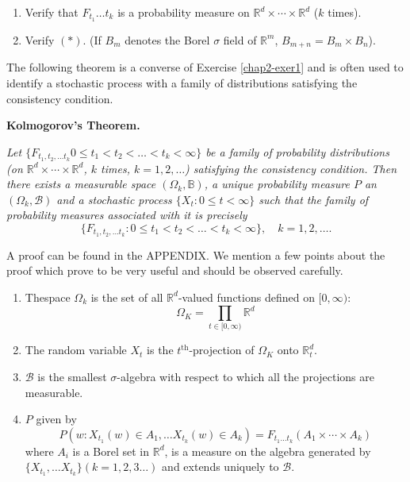 \setcounter{exercise}{0}
\begin{exercise}\label{chap2-exer1}
\begin{enumerate}
\renewcommand{\theenumi}{\alph{enumi}}
\renewcommand{\labelenumi}{(\theenumi)}
\item Verify that $F_{t_{1}}\ldots t_{k}$ is a probability measure on
  $\mathbb{R}^{d}\times\cdots\times \mathbb{R}^{d}$ ($k$ times).

\item Verify $(*)$. (If $B_{m}$ denotes the Borel $\sigma$ field of
  $\mathbb{R}^{m}$, $B_{m+n}=B_{m}\times B_{n}$).
\end{enumerate}
\end{exercise}

The following theorem is a converse of Exercise \ref{chap2-exer1} and
is often used to identify a stochastic process with a family of
distributions satisfying the consistency condition.

\medskip
\noindent
{\bf Kolmogorov's Theorem.}
\smallskip

{\em Let $\{F_{t_{1},t_{2},\ldots t_{k}}0\leq t_{1}<t_{2}<\ldots
  <t_{k}<\infty\}$ be a family of probability distributions (on
  $\mathbb{R}^{d}\times\cdots \times \mathbb{R}^{d}$, $k$ times,
  $k=1,2,\ldots$) satisfying the consistency condition. Then there
  exists a measurable space $(\Omega_{k},\mathbb{B})$, a unique
  probability measure $P$ an $(\Omega_{k},\mathscr{B})$ and a
  stochastic process $\{X_{t}:0\leq t<\infty\}$ such that the family
  of probability measures associated with it is precisely}
$$
\{F_{t_{1},t_{2},\ldots t_{k}}:0\leq t_{1}<t_{2}<\ldots
<t_{k}<\infty\},\quad k=1,2,\ldots.
$$

A proof can be found in the APPENDIX. We mention a few points about
the proof which prove to be very useful and should be observed
carefully.

\begin{enumerate}
\item The\pageoriginale space $\Omega_{k}$ is the set of all
  $\mathbb{R}^{d}$-valued functions defined on $[0,\infty)$:
$$
\Omega_{K}=\prod_{t\in [0,\infty)}\mathbb{R}^{d}
$$

\item The random variable $X_{t}$ is the $t^{\text{th}}$-projection of
  $\Omega_{K}$ onto $\mathbb{R}^{d}_{t}$.

\item $\mathscr{B}$ is the smallest $\sigma$-algebra with respect to
  which all the projections are measurable.

\item $P$ given by
$$
P(w:X_{t_{1}}(w)\in A_{1},\ldots X_{t_{k}}(w)\in A_{k})=F_{t_{1}\ldots
  t_{k}}(A_{1}\times\cdots\times A_{k})
$$
where $A_{i}$ is a Borel set in $\mathbb{R}^{d}$, is a measure on the
algebra generated by $\{X_{t_{1}},\ldots X_{t_{k}}\}(k=1,2,3\ldots)$
and extends uniquely to $\mathscr{B}$.
\end{enumerate}

